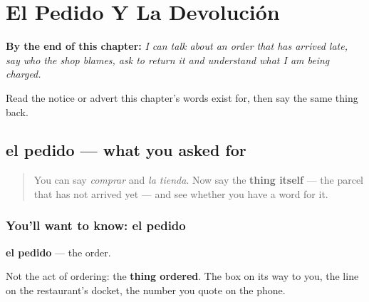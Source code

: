 
\chapter{El Pedido Y La Devolución}
\label{ch:es-pedido}

\begin{chapteropening}
\textbf{By the end of this chapter:} \emph{I can talk about an order that has arrived late, say who the shop blames, ask to return it and understand what I am being charged.}

Read the notice or advert this chapter's words exist for, then say the same thing back.
\end{chapteropening}

\section[el pedido]{el pedido — what you asked for}

\label{lesson:ES-C431-pedido}



\begin{quote}
You can say \emph{comprar} and \emph{la tienda}. Now say the \textbf{thing itself} — the parcel that has not arrived yet — and see whether you have a word for it.
\end{quote}

\subsection*{You'll want to know: el pedido}
\textbf{el pedido} — the order.

Not the act of ordering: the \textbf{thing ordered}. The box on its way to you, the line on the restaurant's docket, the number you quote on the phone.

